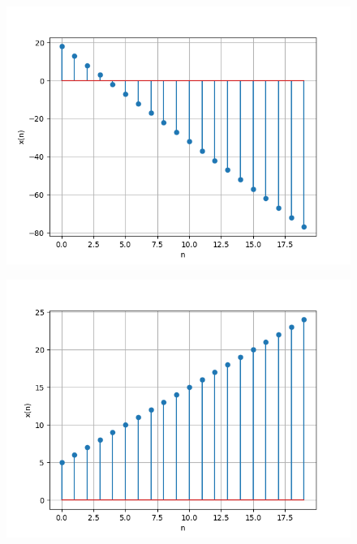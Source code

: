 \documentclass[journal,12pt,twocolumn]{IEEEtran}
\theoremstyle{remark}
\begin{document}
\begin{figure}[h]
      \centering
       \includegraphics[width=1\linewidth]{figs/plot2.png} %
        \caption{}
    \end{figure}
    
\begin{figure}[h]
      \centering
       \includegraphics[width=1\linewidth]{figs/plot3.png} %
        \caption{}
    \end{figure}
    
\end{document}
